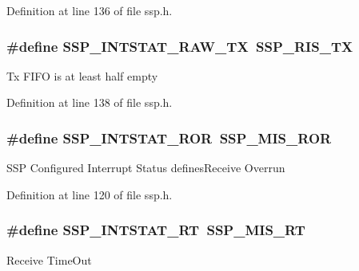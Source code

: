 Definition at line 136 of file ssp.\+h.

\subsubsection[{\texorpdfstring{S\+S\+P\+\_\+\+I\+N\+T\+S\+T\+A\+T\+\_\+\+R\+A\+W\+\_\+\+TX}{SSP_INTSTAT_RAW_TX}}]{\setlength{\rightskip}{0pt plus 5cm}\#define S\+S\+P\+\_\+\+I\+N\+T\+S\+T\+A\+T\+\_\+\+R\+A\+W\+\_\+\+TX~{\bf S\+S\+P\+\_\+\+R\+I\+S\+\_\+\+TX}}\hypertarget{group___s_s_p___public___macros_ga45e392f2778d7ad3ddc710006ce16c96}{}\label{group___s_s_p___public___macros_ga45e392f2778d7ad3ddc710006ce16c96}
Tx F\+I\+FO is at least half empty 

Definition at line 138 of file ssp.\+h.

\subsubsection[{\texorpdfstring{S\+S\+P\+\_\+\+I\+N\+T\+S\+T\+A\+T\+\_\+\+R\+OR}{SSP_INTSTAT_ROR}}]{\setlength{\rightskip}{0pt plus 5cm}\#define S\+S\+P\+\_\+\+I\+N\+T\+S\+T\+A\+T\+\_\+\+R\+OR~{\bf S\+S\+P\+\_\+\+M\+I\+S\+\_\+\+R\+OR}}\hypertarget{group___s_s_p___public___macros_ga849060f3ae22fc69e37410b1607c6d49}{}\label{group___s_s_p___public___macros_ga849060f3ae22fc69e37410b1607c6d49}
S\+SP Configured Interrupt Status defines\+Receive Overrun 

Definition at line 120 of file ssp.\+h.

\subsubsection[{\texorpdfstring{S\+S\+P\+\_\+\+I\+N\+T\+S\+T\+A\+T\+\_\+\+RT}{SSP_INTSTAT_RT}}]{\setlength{\rightskip}{0pt plus 5cm}\#define S\+S\+P\+\_\+\+I\+N\+T\+S\+T\+A\+T\+\_\+\+RT~{\bf S\+S\+P\+\_\+\+M\+I\+S\+\_\+\+RT}}\hypertarget{group___s_s_p___public___macros_gaec7fec10a4c64bd3391c91c832e040c5}{}\label{group___s_s_p___public___macros_gaec7fec10a4c64bd3391c91c832e040c5}
Receive Time\+Out 

